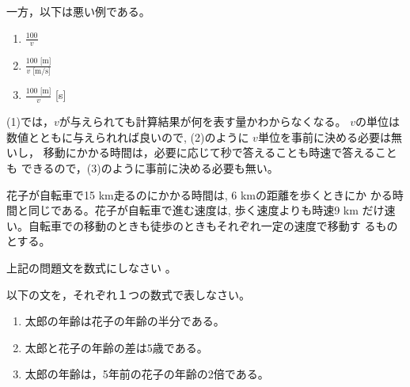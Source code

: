 \documentclass[twocolumn,11pt]{jarticle}
\begin{document}
一方，以下は悪い例である。
\begin{enumerate}
\item $\displaystyle\frac{100}{v}$
\item $\displaystyle\frac{100\mbox{~[m]}}{v\mbox{~[m$/$s]}}$
\item $\displaystyle\frac{100\mbox{~[m]}}{v}$ [s]
\end{enumerate}
(1)では，$v$が与えられても計算結果が何を表す量かわからなくなる。
$v$の単位は数値とともに与えられれば良いので, (2)のように
$v$単位を事前に決める必要は無いし，
移動にかかる時間は，必要に応じて秒で答えることも時速で答えることも
できるので，(3)のように事前に決める必要も無い。

\noindent
[問]  花子が自転車で15 km走るのにかかる時間は, 6 kmの距離を歩くときにか
かる時間と同じである。花子が自転車で進む速度は, 歩く速度よりも時速9 km
だけ速い。自転車での移動のときも徒歩のときもそれぞれ一定の速度で移動す
るものとする。

上記の問題文を数式にしなさい
。

\exercise
以下の文を，それぞれ１つの数式で表しなさい。
\begin{enumerate}
	\item 太郎の年齢は花子の年齢の半分である。
	\item 太郎と花子の年齢の差は5歳である。
	\item 太郎の年齢は，5年前の花子の年齢の2倍である。
\end{enumerate}

\end{document}
